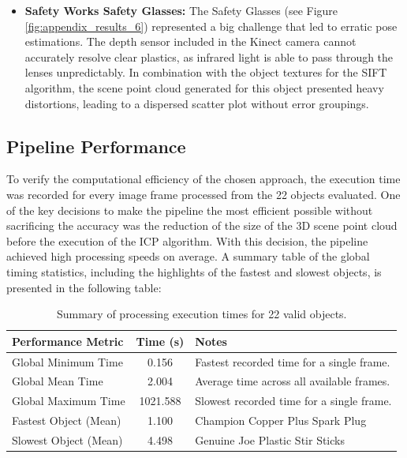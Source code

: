 \begin{itemize}
    \item \textbf{Safety Works Safety Glasses:}
    \label{sec:transparent_plastic}
    The Safety Glasses (see Figure \ref{fig:appendix_results_6}) represented a big challenge that led to erratic pose estimations. The depth sensor included in the Kinect camera cannot accurately resolve clear plastics, as infrared light is able to pass through the lenses unpredictably. In combination with the object textures for the SIFT algorithm, the scene point cloud generated for this object presented heavy distortions, leading to a dispersed scatter plot without error groupings.
\end{itemize}

\subsection{Pipeline Performance}
To verify the computational efficiency of the chosen approach, the execution time was recorded for every image frame processed from the 22 objects evaluated. One of the key decisions to make the pipeline the most efficient possible without sacrificing the accuracy was the reduction of the size of the 3D scene point cloud before the execution of the ICP algorithm. With this decision, the pipeline achieved high processing speeds on average. A summary table of the global timing statistics, including the highlights of the fastest and slowest objects, is presented in the following table:

\begin{table}[htbp]
    \centering
    \renewcommand{\arraystretch}{1.3} %
    \caption{Summary of processing execution times for 22 valid objects.}
    \vspace{0.2cm} %
    \begin{tabular}{|l|c|l|}
        \hline
        \textbf{Performance Metric} & \textbf{Time (s)} & \textbf{Notes} \\
        \hline \hline
        Global Minimum Time & 0.156 & Fastest recorded time for a single frame. \\
        \hline
        Global Mean Time & 2.004 & Average time across all available frames. \\
        \hline
        Global Maximum Time & 1021.588 & Slowest recorded time for a single frame. \\
        \hline \hline
        Fastest Object (Mean) & 1.100 & Champion Copper Plus Spark Plug \\
        \hline
        Slowest Object (Mean) & 4.498 & Genuine Joe Plastic Stir Sticks \\
        \hline
    \end{tabular}
    \label{tab:timing_stats}
\end{table}

